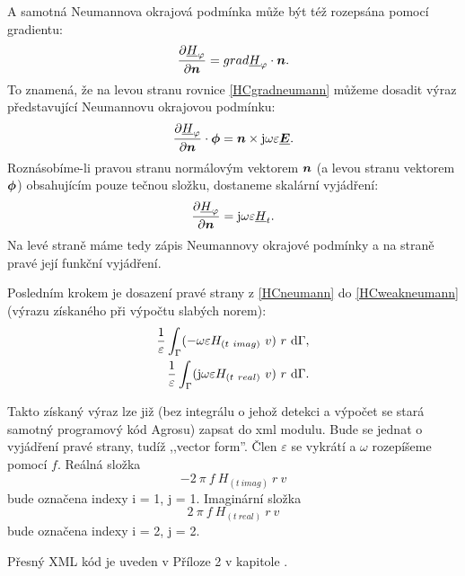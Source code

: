 \documentclass[12pt,a4paper,oneside]{article}
\numberwithin{equation}{section} %
\numberwithin{figure}{section} %
\numberwithin{table}{section} %
\newcommand{\mj}{\mathrm{j}} %
\renewcommand{\vec}[1]{\mbox{\boldmath$#1$}} %
\newcommand{\faz}[1]{{\underline{#1}}} %
\begin{document}
A samotná Neumannova okrajová podmínka může být též rozepsána pomocí gradientu:
\begin{equation}
\label{HCgradneumann}
\frac{\partial \faz{H} _{\varphi}}{\partial \vec{n}} = grad \faz{H} _{\varphi} \cdot \vec{n} .
\end{equation}
To znamená, že na levou stranu rovnice \ref{HCgradneumann} můžeme dosadit výraz představující Neumannovu okrajovou podmínku:
\begin{equation}
\label{NeumannHCvek}
\frac{\partial \faz{H}_{\varphi}}{\partial \vec{n}} \cdot \vec{\phi} = \vec{n} \times \mj \omega \varepsilon \faz{\vec{E}} .
\end{equation}
Roznásobíme-li pravou stranu normálovým vektorem $\vec{n}$ (a levou stranu vektorem $\vec{\phi}$) obsahujícím pouze tečnou složku, dostaneme skalární vyjádření:
\begin{equation}
\label{HCneumann}
\frac{\partial \faz{H} _{\varphi}}{\partial \vec{n}} = \mj \omega \varepsilon \faz{H} _t .
\end{equation}
Na levé straně máme tedy zápis Neumannovy okrajové podmínky a na straně pravé její funkční vyjádření.

Posledním krokem je dosazení pravé strany z \ref{HCneumann} do \ref{HCweakneumann} (výrazu získaného při výpočtu slabých norem):
\begin{subequations}
\begin{align}
\frac{1}{\varepsilon} \int _{\Gamma} (- \omega \varepsilon H_{(t~imag)} ~ v ) ~ r ~ \ud \Gamma ,
\\ 
\frac{1}{\varepsilon} \int _{\Gamma} ( \mj \omega \varepsilon H_{(t~real)} ~ v ) ~ r ~ \ud \Gamma .
\end{align}
\end{subequations}

Takto získaný výraz lze již (bez integrálu o jehož detekci a výpočet se stará samotný programový kód Agrosu) zapsat do xml modulu. Bude se jednat o vyjádření pravé strany, tudíž ,,vector form''. Člen $\varepsilon$ se vykrátí a $\omega$ rozepíšeme pomocí $f$. Reálná složka 
\begin{equation}
- 2 ~ \pi ~ f ~ H_{(t~imag)} ~ r ~ v
\end{equation} 
bude označena indexy i = 1, j = 1. Imaginární složka 
\begin{equation}
2 ~ \pi ~ f ~ H_{(t~real)} ~ r ~ v
\end{equation}
bude označena indexy i = 2, j = 2.

Přesný XML kód je uveden v Příloze 2 v kapitole .
\end{document}

